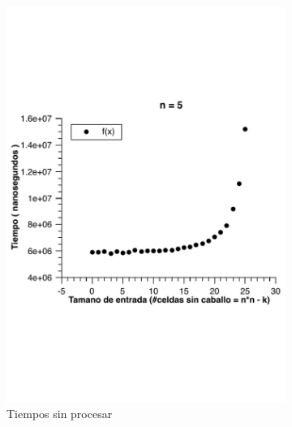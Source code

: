 \begin{figure}[H]
        \centering
        \begin{subfigure}[b]{0.5\textwidth}
                \includegraphics[width=\textwidth]{imagenes/grafico3-n-5-norm.pdf}
                \caption{Tiempos sin procesar}
        \end{subfigure}%
        ~ %
        \begin{subfigure}[b]{0.5\textwidth}

\end{subfigure}
\end{figure}
